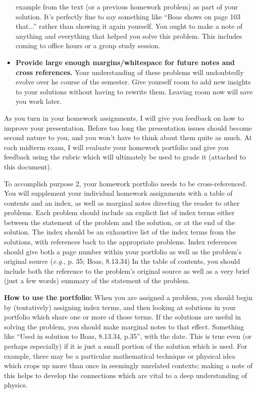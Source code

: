 \documentclass{article}
\begin{document}
\begin{itemize}
  example from the text (or a previous homework problem) as part of
  your solution.  It's perfectly fine to say something like ``Boas
  shows on page 103 that...'' rather than showing it again yourself.
  You ought to make a note of anything and everything that helped you
  solve this problem.  This includes coming to office hours or a group
  study session.
\item{\bf Provide large enough margins/whitespace for future notes and
    cross references.}  Your understanding of these problems will
  undoubtedly evolve over he course of the semester.  Give yourself
  room to add new insights to your solutions without having to rewrite
  them.  Leaving room now will save you work later.
\end{itemize}
As you turn in your homework assignments, I will give you feedback on
how to improve your presentation.  Before too long the presentation
issues should become second nature to you, and you won't have to think
about them quite as much.  At each midterm exam, I will evaluate your
homework portfolio and give you feedback using the rubric which will
ultimately be used to grade it (attached to this document).

To accomplish purpose 2, your homework portfolio needs to be
cross-referenced.  You will supplement your individual homework
assignments with a table of contents and an index, as well as marginal
notes directing the reader to other problems.  Each problem should
include an explicit list of index terms either between the statement
of the problem and the solution, or at the end of the solution.  The
index should be an exhaustive list of the index terms from the
solutions, with references back to the appropriate problems.  Index
references should give both a page number within your portfolio as
well as the problem's original source ({\it e.g.}, p. 35; Boas,
8.13.34) In the table of contents, you should include both the
reference to the problem's original source as well as a very brief
(just a few words) summary of the statement of the problem.

{\bf How to use the portfolio:}
When you are assigned a problem, you should begin by (tentatively)
assigning index terms, and then looking at solutions in your portfolio
which share one or more of those terms.  If the solutions are useful
in solving the problem, you should make marginal notes to that effect.
Something like ``Used in solution to Boas, 8.13.34, p.35'', with the
date.  This is true even (or perhaps especially) if it is just a small
portion of the solution which is used.  For example, there may be a
particular mathematical technique or physical idea which crops up more
than once in seemingly unrelated contexts; making a note of this helps
to develop the connections which are vital to a deep understanding of
physics.
\end{document}
